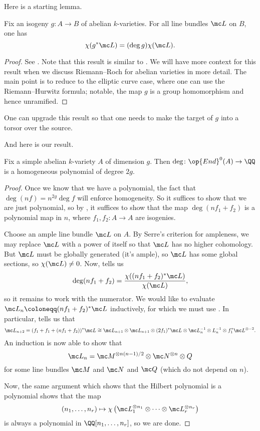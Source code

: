 \documentclass[../notes.tex]{subfiles}
\begin{document}
Here is a starting lemma.
\begin{lemma} \label{lem:deg-by-euler-char}
	Fix an isogeny $g\colon A\to B$ of abelian $k$-varieties. For all line bundles $\mc L$ on $B$, one has
	\[\chi(g^*\mc L)=(\deg g)\chi(\mc L).\]
\end{lemma}
\begin{proof}
	See \cite[Theorem~12.2]{mumford}. Note that this result is similar to . We will have more context for this result when we discuss Riemann--Roch for abelian varieties in more detail. The main point is to reduce to the elliptic curve case, where one can use the Riemann--Hurwitz formula; notable, the map $g$ is a group homomorphism and hence unramified.
\end{proof}
\begin{remark}
	One can upgrade this result so that one needs to make the target of $g$ into a torsor over the source.
\end{remark}
And here is our result.
\begin{theorem} \label{thm:deg-is-poly}
	Fix a simple abelian $k$-variety $A$ of dimension $g$. Then $\deg\colon\op{End}^0(A)\to\QQ$ is a homogeneous polynomial of degree $2g$.
\end{theorem}
\begin{proof}
	Once we know that we have a polynomial, the fact that $\deg(nf)=n^{2g}\deg f$ will enforce homogeneity. So it suffices to show that we are just polynomial, so by , it suffices to show that the map $\deg(nf_1+f_2)$ is a polynomial map in $n$, where $f_1,f_2\colon A\to A$ are isogenies.

	Choose an ample line bundle $\mc L$ on $A$. By Serre's criterion for ampleness, we may replace $\mc L$ with a power of itself so that $\mc L$ has no higher cohomology. But $\mc L$ must be globally generated (it's ample), so $\mc L$ has some global sections, so $\chi(\mc L)\ne0$. Now,  tells us
	\[\deg(nf_1+f_2)=\frac{\chi((nf_1+f_2)^*\mc L)}{\chi(\mc L)},\]
	so it remains to work with the numerator. We would like to evaluate $\mc L_n\coloneqq (nf_1+f_2)^*\mc L$ inductively, for which we must use . In particular,  tells us that
	\[\mc L_{n+2}=(f_1+f_1+(nf_1+f_2))^*\mc L\cong\mc L_{n+1}\otimes\mc L_{n+1}\otimes(2f_1)^*\mc L\otimes\mc L_n^{-1}\otimes L_n^{-1}\otimes f_1^*\mc L^{\otimes-2}.\]
	An induction is now able to show that
	\[\mc L_n=\mc M^{\otimes n(n-1)/2}\otimes\mc N^{\otimes n}\otimes Q\]
	for some line bundles $\mc M$ and $\mc N$ and $\mc Q$ (which do not depend on $n$).

	Now, the same argument which shows that the Hilbert polynomial is a polynomial shows that the map
	\[(n_1,\ldots,n_r)\mapsto\chi\left(\mc L_1^{\otimes n_1}\otimes\cdots\otimes\mc L_r^{\otimes n_r}\right)\]
	is always a polynomial in $\QQ[n_1,\ldots,n_r]$, so we are done.
\end{proof}
\end{document}

